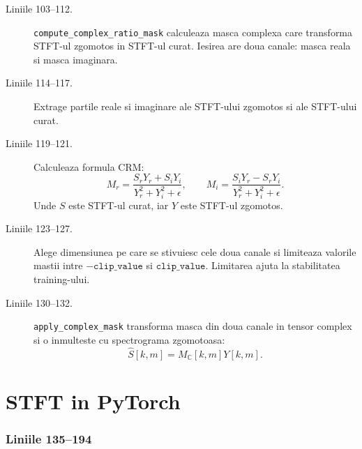 \documentclass[12pt,a4paper]{report}
\newcommand{\codechunk}[2]{%
\subsection*{Liniile #1--#2}

}
\begin{document}
\begin{description}
    \item[Liniile 103--112.] \texttt{compute\_complex\_ratio\_mask} calculeaza masca
    complexa care transforma STFT-ul zgomotos in STFT-ul curat. Iesirea are doua
    canale: masca reala si masca imaginara.

    \item[Liniile 114--117.] Extrage partile reale si imaginare ale STFT-ului
    zgomotos si ale STFT-ului curat.

    \item[Liniile 119--121.] Calculeaza formula CRM:
    \[
    M_r = \frac{S_rY_r + S_iY_i}{Y_r^2 + Y_i^2 + \epsilon},
    \qquad
    M_i = \frac{S_iY_r - S_rY_i}{Y_r^2 + Y_i^2 + \epsilon}.
    \]
    Unde \(S\) este STFT-ul curat, iar \(Y\) este STFT-ul zgomotos.

    \item[Liniile 123--127.] Alege dimensiunea pe care se stivuiesc cele doua
    canale si limiteaza valorile mastii intre \(-\texttt{clip\_value}\) si
    \(\texttt{clip\_value}\). Limitarea ajuta la stabilitatea training-ului.

    \item[Liniile 130--132.] \texttt{apply\_complex\_mask} transforma masca din doua
    canale in tensor complex si o inmulteste cu spectrograma zgomotoasa:
    \[
    \hat{S}[k,m] = M_{\mathbb{C}}[k,m]Y[k,m].
    \]
\end{description}

\chapter{STFT in PyTorch}

\codechunk{135}{194}
\end{document}
